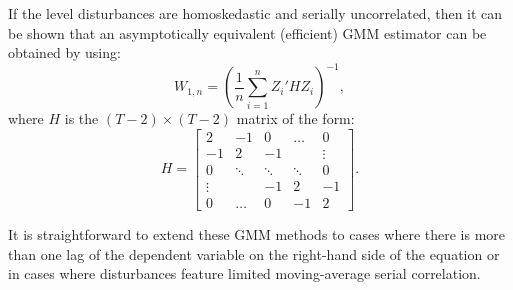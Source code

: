 \documentclass[
  11pt,
]{book}
\theoremstyle{definition}
\theoremstyle{definition}
\theoremstyle{definition}
\theoremstyle{definition}
\theoremstyle{remark}
\begin{document}
If the level disturbances are homoskedastic and serially uncorrelated, then it can be shown that an asymptotically equivalent (efficient) GMM estimator can be obtained by using:
\[
W_{1,n} = \left(\frac{1}{n}\sum_{i=1}^{n}Z_i'HZ_i\right)^{-1},
\]
where \(H\) is the \((T-2) \times (T-2)\) matrix of the form:
\[
H = \left[\begin{array}{ccccccc}
2 & -1 & 0 & \dots &0 \\
-1 & 2 & -1 &  & \vdots \\
0 & \ddots& \ddots & \ddots & 0 \\
\vdots &  & -1 & 2&-1\\
0&\dots & 0 & -1 & 2
\end{array}\right].
\]

It is straightforward to extend these GMM methods to cases where there is more than one lag of the dependent variable on the right-hand side of the equation or in cases where disturbances feature limited moving-average serial correlation.
\end{document}
